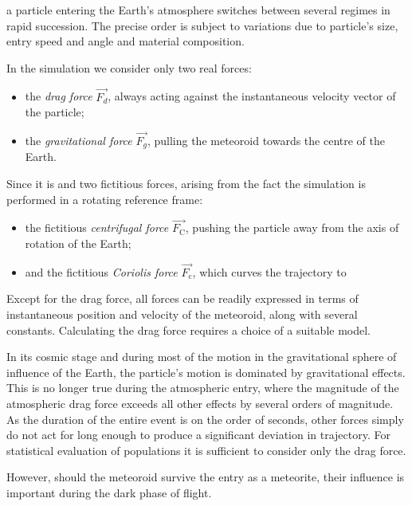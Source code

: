         a particle entering the Earth's atmosphere switches between several regimes in rapid succession.
        The precise order is subject to variations due to particle's size, entry speed and angle
        and material composition.


        In the simulation we consider only two real forces:
        \begin{itemize}
            \item the \emph{drag force} $\vec{F_d}$, always acting against the instantaneous velocity vector of the particle;
            \item the \emph{gravitational force} $\vec{F_g}$, pulling the meteoroid towards the centre of the Earth.
        \end{itemize}

        Since it is 
        and two fictitious forces, arising from the fact the simulation is performed in a rotating reference frame:
        \begin{itemize}
            \item the fictitious \emph{centrifugal force} $\vec{F_{\mathrm{C}}}$, pushing the particle away from the axis of rotation of the Earth;
            \item and the fictitious \emph{Coriolis force} $\vec{F_{\mathrm{c}}}$, which curves the trajectory to
        \end{itemize}

        Except for the drag force, all forces can be readily expressed in terms of instantaneous position and velocity of the meteoroid,
        along with several constants.
        Calculating the drag force requires a choice of a suitable model.

        In its cosmic stage and during most of the motion in the gravitational sphere of influence of the Earth,
        the particle's motion is dominated by gravitational effects. This is no longer true during the atmospheric entry,
        where the magnitude of the atmospheric drag force exceeds all other effects by several orders of magnitude.
        As the duration of the entire event is on the order of seconds, other forces simply do not act for long enough
        to produce a significant deviation in trajectory. For statistical evaluation of populations it is sufficient
        to consider only the drag force.

        However, should the meteoroid survive the entry as a meteorite, their influence is important during the dark phase of flight.

